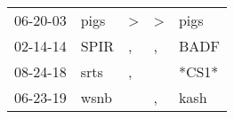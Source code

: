 \begin{supertabular}{p{0.07\textwidth}p{0.06\textwidth}p{0.02\textwidth}p{0.02\textwidth}p{0.06\textwidth}}
 06-20-03\textsuperscript{} &  pigs\textsuperscript{} &  \textgreater &  \textgreater &  pigs\textsuperscript{} \\
 02-14-14\textsuperscript{} &  SPIR\textsuperscript{} &             , &             , &  BADF\textsuperscript{} \\
 08-24-18\textsuperscript{} &  srts\textsuperscript{} &             , &               &                   *CS1* \\
 06-23-19\textsuperscript{} &  wsnb\textsuperscript{} &               &             , &  kash\textsuperscript{} \\
\end{supertabular}
